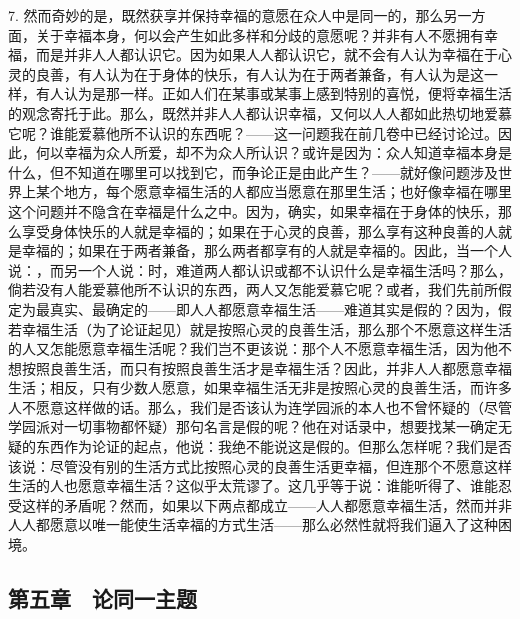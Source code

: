 7. 然而奇妙的是，既然获享并保持幸福的意愿在众人中是同一的，那么另一方面，关于幸福本身，何以会产生如此多样和分歧的意愿呢？并非有人不愿拥有幸福，而是并非人人都认识它。因为如果人人都认识它，就不会有人认为幸福在于心灵的良善，有人认为在于身体的快乐，有人认为在于两者兼备，有人认为是这一样，有人认为是那一样。正如人们在某事或某事上感到特别的喜悦，便将幸福生活的观念寄托于此。那么，既然并非人人都认识幸福，又何以人人都如此热切地爱慕它呢？谁能爱慕他所不认识的东西呢？——这一问题我在前几卷中已经讨论过。因此，何以幸福为众人所爱，却不为众人所认识？或许是因为：众人知道幸福本身是什么，但不知道在哪里可以找到它，而争论正是由此产生？——就好像问题涉及世界上某个地方，每个愿意幸福生活的人都应当愿意在那里生活；也好像幸福在哪里这个问题并不隐含在幸福是什么之中。因为，确实，如果幸福在于身体的快乐，那么享受身体快乐的人就是幸福的；如果在于心灵的良善，那么享有这种良善的人就是幸福的；如果在于两者兼备，那么两者都享有的人就是幸福的。因此，当一个人说：，而另一个人说：时，难道两人都认识或都不认识什么是幸福生活吗？那么，倘若没有人能爱慕他所不认识的东西，两人又怎能爱慕它呢？或者，我们先前所假定为最真实、最确定的——即人人都愿意幸福生活——难道其实是假的？因为，假若幸福生活（为了论证起见）就是按照心灵的良善生活，那么那个不愿意这样生活的人又怎能愿意幸福生活呢？我们岂不更该说：那个人不愿意幸福生活，因为他不想按照良善生活，而只有按照良善生活才是幸福生活？因此，并非人人都愿意幸福生活；相反，只有少数人愿意，如果幸福生活无非是按照心灵的良善生活，而许多人不愿意这样做的话。那么，我们是否该认为连学园派的本人也不曾怀疑的（尽管学园派对一切事物都怀疑）那句名言是假的呢？他在对话录中，想要找某一确定无疑的东西作为论证的起点，他说：我绝不能说这是假的。但那么怎样呢？我们是否该说：尽管没有别的生活方式比按照心灵的良善生活更幸福，但连那个不愿意这样生活的人也愿意幸福生活？这似乎太荒谬了。这几乎等于说：谁能听得了、谁能忍受这样的矛盾呢？然而，如果以下两点都成立——人人都愿意幸福生活，然而并非人人都愿意以唯一能使生活幸福的方式生活——那么必然性就将我们逼入了这种困境。\par


\subsection{第五章　论同一主题}

